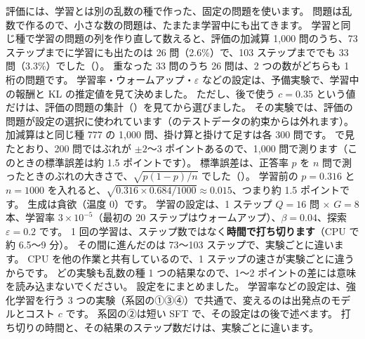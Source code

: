 評価には、学習とは別の乱数の種で作った、固定の問題を使います。
問題は乱数で作るので、小さな数の問題は、たまたま学習中にも出てきます。
学習と同じ種で学習の問題の列を作り直して数えると、評価の加減算 1,000 問のうち、73 ステップまでに学習にも出たのは 26 問（2.6\%）で、103 ステップまででも 33 問（3.3\%）でした（）。
重なった 33 問のうち 26 問は、2 つの数がどちらも 1 桁の問題です。
学習率・ウォームアップ・$\varepsilon$ などの設定は、予備実験で、学習中の報酬と KL の推定値を見て決めました。
ただし、後で使う $c=0.35$ という値だけは、評価の問題の集計（）を見てから選びました。
その実験では、評価の問題が設定の選択に使われています（のテストデータの約束からは外れます）。
加減算はと同じ種 777 の 1,000 問、掛け算と掛けて足すは各 300 問です。
で見たとおり、200 問ではぶれが $\pm2$〜3 ポイントあるので、1,000 問で測ります（このときの標準誤差は約 1.5 ポイントです）。
標準誤差は、正答率 $p$ を $n$ 問で測ったときのぶれの大きさで、$\sqrt{p(1-p)/n}$ でした（）。
学習前の $p=0.316$ と $n=1000$ を入れると、$\sqrt{0.316\times0.684/1000}\approx0.015$、つまり約 1.5 ポイントです。
生成は貪欲（温度 0）です。
学習の設定は、1 ステップ $Q=16$ 問 $\times$ $G=8$ 本、学習率 $3\times10^{-5}$（最初の 20 ステップはウォームアップ）、$\beta=0.04$、探索 $\varepsilon=0.2$ です。
1 回の学習は、ステップ数ではなく\textbf{時間で打ち切ります}（CPU で約 6.5〜9 分）。
その間に進んだのは 73〜103 ステップで、実験ごとに違います。
CPU を他の作業と共有しているので、1 ステップの速さが実験ごとに違うからです。
どの実験も乱数の種 1 つの結果なので、1〜2 ポイントの差には意味を読み込まないでください。
設定をにまとめました。
学習率などの設定は、強化学習を行う 3 つの実験（系図の①③④）で共通で、変えるのは出発点のモデルとコスト $c$ です。
系図の②は短い SFT で、その設定はの後で述べます。
打ち切りの時間と、その結果のステップ数だけは、実験ごとに違います。

